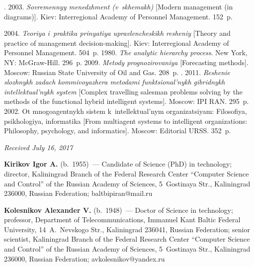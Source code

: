 \begin{multicols}{2}
{{\begin{thebibliography}{99}
  . 2003. \textit{Sovremennyy 
menedzhment (v~skhemakh)} [Modern 
management (in diagrams)]. Kiev: 
Interregional Academy of Personnel Management. 152~p.

   2004. \textit{Teoriya i~praktika prinyatiya 
upravlencheskikh resheniy} [Theory and practice of management decision-making]. 
Kiev: Interregional Academy of Personnel Management. 504~p.
   1980. \textit{The analytic hierarchy process}. New York, NY: 
McGraw-Hill. 296~p.
   2009. \textit{Metody prognozirovaniya} 
  [Forecasting methods]. Moscow: Russian State University of Oil 
and Gas. 208~p.
  . 2011. \textit{Reshenie slozhnykh zadach kommivoyazhera 
metodami funktsional'nykh gibridnykh intellektual'nykh system} [Complex travelling 
salesman problems solving by the methods of the functional hybrid intelligent 
systems]. Moscow: IPI RAN. 295~p.
   2002. Ot mnogoagentnykh sistem k~intellektual'nym 
organizatsiyam: Filosofiya, psikhologiya, informatika [From multiagent systems to 
intelligent organizations: Philosophy, psychology, and informatics]. Moscow: 
Editorial URSS. 352~p.
\end{thebibliography}

 }
 }

\end{multicols}

\vspace*{-3pt}

\hfill{\small\textit{Received July 16, 2017}}
  
  \Contr
  
  \noindent
  \textbf{Kirikov Igor A.} (b.\ 1955)~--- Candidate of  Science (PhD) in 
technology; director, Kaliningrad Branch of the Federal Research Center ``Computer 
Science and Control'' of the Russian Academy of Sciences, 5~Gostinaya Str., 
Kaliningrad 236000, Russian Federation; \mbox{baltbipiran@mail.ru}
  
  \vspace*{3pt}
  
  \noindent
  \textbf{Kolesnikov Alexander V.} (b.\ 1948)~--- Doctor of Science in 
technology; professor, Department of Telecommunications, Immanuel Kant Baltic 
Federal University, 14~A.~Nevskogo Str., Kaliningrad 236041, Russian Federation; 
senior scientist, Kaliningrad Branch of the Federal Research Center ``Computer 
Science and Control'' of the Russian Academy of Sciences, 5~Gostinaya Str., 
Kaliningrad 236000, Russian Federation; \mbox{avkolesnikov@yandex.ru} 
  
